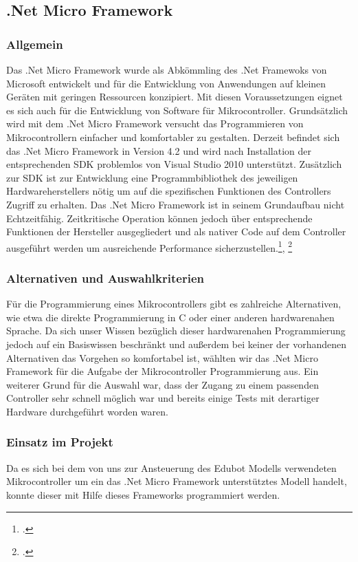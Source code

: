 \subsection{.Net Micro Framework}
\subsubsection{Allgemein}
Das .Net Micro Framework wurde als Abkömmling des .Net Framewoks von Microsoft entwickelt und für die Entwicklung von Anwendungen auf kleinen Geräten mit geringen Ressourcen konzipiert. Mit diesen Voraussetzungen eignet es sich auch für die Entwicklung von Software für Mikrocontroller. Grundsätzlich wird mit dem .Net Micro Framework versucht das Programmieren von Mikrocontrollern einfacher und komfortabler zu gestalten. Derzeit befindet sich das .Net Micro Framework in Version 4.2 und wird nach Installation der entsprechenden SDK problemlos von Visual Studio 2010 unterstützt. 
Zusätzlich zur SDK ist zur Entwicklung eine Programmbibliothek des jeweiligen Hardwareherstellers nötig um auf die spezifischen Funktionen des Controllers Zugriff zu erhalten.
Das .Net Micro Framework ist in seinem Grundaufbau nicht Echtzeitfähig. Zeitkritische Operation können jedoch über entsprechende Funktionen der Hersteller ausgegliedert und als nativer Code auf dem Controller ausgeführt werden um ausreichende Performance sicherzustellen.\footcite[vgl.][]{micromicro}, \footcite[vgl.][]{microwiki}
\subsubsection{Alternativen und Auswahlkriterien}
Für die Programmierung eines Mikrocontrollers gibt es zahlreiche Alternativen, wie etwa die direkte Programmierung in C oder einer anderen hardwarenahen Sprache. Da sich unser Wissen bezüglich dieser hardwarenahen Programmierung jedoch auf ein Basiswissen beschränkt und außerdem bei keiner der vorhandenen Alternativen das Vorgehen so komfortabel ist, wählten wir das .Net Micro Framework für die Aufgabe der Mikrocontroller Programmierung aus. 
Ein weiterer Grund für die Auswahl war, dass der Zugang zu einem passenden Controller sehr schnell möglich war und bereits einige Tests mit derartiger Hardware durchgeführt worden waren.
\subsubsection{Einsatz im Projekt}
Da es sich bei dem von uns zur Ansteuerung des Edubot Modells verwendeten Mikrocontroller um ein das .Net Micro Framework unterstütztes Modell handelt, konnte dieser mit Hilfe dieses Frameworks programmiert werden. 

